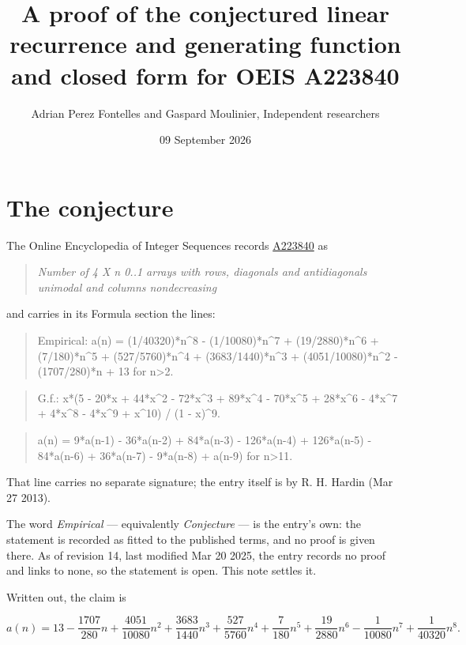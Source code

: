 \documentclass[11pt]{article}
\title{A proof of the conjectured linear recurrence and generating function and closed form for OEIS A223840}
\author{Adrian Perez Fontelles and Gaspard Moulinier, Independent researchers}
\date{09 September 2026}
\theoremstyle{definition}
\begin{document}
\maketitle
\section{The conjecture}

The Online Encyclopedia of Integer Sequences records \href{https://oeis.org/A223840}{A223840} as

\begin{quote}\itshape Number of 4 X n 0..1 arrays with rows, diagonals and antidiagonals unimodal and columns nondecreasing\end{quote}

and carries in its Formula section the lines:

\begin{quote}\ttfamily Empirical: a(n) = (1/40320)*n\textasciicircum{}8 - (1/10080)*n\textasciicircum{}7 + (19/2880)*n\textasciicircum{}6 + (7/180)*n\textasciicircum{}5 + (527/5760)*n\textasciicircum{}4 + (3683/1440)*n\textasciicircum{}3 + (4051/10080)*n\textasciicircum{}2 - (1707/280)*n + 13 for n>2.\end{quote}

\begin{quote}\ttfamily G.f.: x*(5 - 20*x + 44*x\textasciicircum{}2 - 72*x\textasciicircum{}3 + 89*x\textasciicircum{}4 - 70*x\textasciicircum{}5 + 28*x\textasciicircum{}6 - 4*x\textasciicircum{}7 + 4*x\textasciicircum{}8 - 4*x\textasciicircum{}9 + x\textasciicircum{}10) / (1 - x)\textasciicircum{}9.\end{quote}

\begin{quote}\ttfamily a(n) = 9*a(n-1) - 36*a(n-2) + 84*a(n-3) - 126*a(n-4) + 126*a(n-5) - 84*a(n-6) + 36*a(n-7) - 9*a(n-8) + a(n-9) for n>11.\end{quote}

That line carries no separate signature; the entry itself is by R. H. Hardin (Mar 27 2013).

The word {\itshape Empirical} --- equivalently {\itshape Conjecture} --- is the entry's own: the statement is recorded as fitted to the published terms, and no proof is given there. As of revision 14, last modified Mar 20 2025, the entry records no proof and links to none, so the statement is open. This note settles it.

Written out, the claim is

\[a(n) = 13 - \frac{1707}{280}n + \frac{4051}{10080}n^{2} + \frac{3683}{1440}n^{3} + \frac{527}{5760}n^{4} + \frac{7}{180}n^{5} + \frac{19}{2880}n^{6} - \frac{1}{10080}n^{7} + \frac{1}{40320}n^{8}.\]
\end{document}
